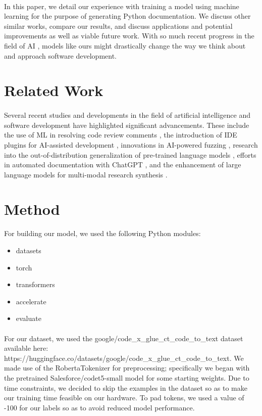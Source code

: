 \documentclass[12pt]{article}
\begin{document}
	\paragraph{} In this paper, we detail our experience with training a model using machine learning for the purpose of generating Python documentation. We discuss other similar works, compare our results, and discuss applications and potential improvements as well as viable future work. With so much recent progress in the field of AI \cite{shietal2020IoT_AI}, models like ours might drastically change the way we think about and approach software development.

	\section{Related Work}
	\paragraph{} Several recent studies and developments in the field of artificial intelligence and software development have highlighted significant advancements. These include the use of ML in resolving code review comments \cite{google2023codeReviewML}, the introduction of IDE plugins for AI-assisted development \cite{qodoAI2024idePlugin}, innovations in AI-powered fuzzing \cite{google2023aiFuzzing, cso2024aiFuzzing}, research into the out-of-distribution generalization of pre-trained language models \cite{chen2023oodGeneralization}, efforts in automated documentation with ChatGPT \cite{awekrx2024autodoc}, and the enhancement of large language models for multi-modal research synthesis \cite{wiggers2023largeModels}.


	\section{Method}
	For building our model, we used the following Python modules:
	\begin{itemize}
		\item datasets
		\item torch
		\item transformers
		\item accelerate
		\item evaluate
	\end{itemize}
	\paragraph{} For our dataset, we used the google/code\_x\_glue\_ct\_code\_to\_text dataset available here: https://huggingface.co/datasets/google/code\_x\_glue\_ct\_code\_to\_text. We made use of the RobertaTokenizer for preprocessing; specifically we began with the pretrained Salesforce/codet5-small model for some starting weights. Due to time constraints, we decided to skip the examples in the dataset so as to make our training time feasible on our hardware. To pad tokens, we used a value of -100 for our labels so as to avoid reduced model performance. 
\end{document}
